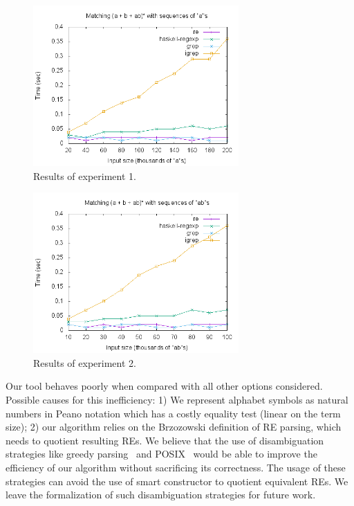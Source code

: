 \documentclass{llncs}
\begin{document}
\begin{figure}[!ht]
    \includegraphics[width=0.7\textwidth]{as.png}
   \centering
   \caption{Results of experiment 1.}
   \label{fig:graph1}
\end{figure}

\begin{figure}[!ht]
    \includegraphics[width=0.7\textwidth]{abs.png}
   \centering
   \caption{Results of experiment 2.}
   \label{fig:graph2}
\end{figure}

Our tool behaves poorly when compared with all other options
considered. Possible causes for this inefficiency: 1) We represent
alphabet symbols as natural numbers in Peano notation which has
a costly equality test (linear on the term size); 2) our algorithm
relies on the Brzozowski definition of RE
parsing, which needs to quotient resulting REs. We believe that the
use of disambiguation strategies like greedy parsing~\cite{FrischC04}
and POSIX~\cite{SulzmannL14} would be able to improve the efficiency
of our algorithm without sacrificing its correctness. The usage of
these strategies can avoid the use of smart constructor to quotient
equivalent REs. We leave the formalization of such disambiguation
strategies for future work.
\end{document}
